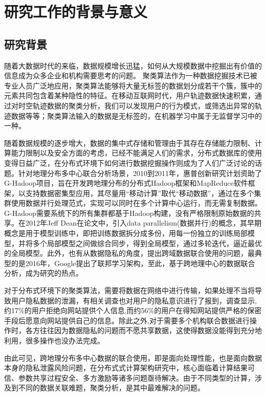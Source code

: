 \thesischapterexordium

\section{研究工作的背景与意义}

\subsection{研究背景}

随着大数据时代的来临，数据规模增长迅猛，如何从大规模数据中挖掘出有价值的信息成为众多企业和机构需要思考的问题。
聚类算法作为一种数据挖掘技术已被专业人员广泛地应用，聚类算法能够将大量无标签的数据划分成若干个簇，簇中的元素共同包含着某种隐性的特征。在移动互联网时代，用户轨迹数据快速积累，通过对时空轨迹数据的聚类分析，我们可以发现用户的行为模式，或筛选出异常的轨迹数据等等；聚类算法输入的数据是无标签的，在机器学习中属于无监督学习中的一种。

随着数据规模的逐步增大，数据的集中式存储和管理由于其存在存储能力限制、计算能力限制以及安全方面的考虑，已经不能满足人们的需求，分布式数据库的使用变得日益广泛，在分布式环境下如何进行数据挖掘操作则成为了人们广泛讨论的话题。针对地理分布多中心联合分析场景，2010到2011年，惠普创新研究计划资助了G-Hadoop项目，旨在开发跨地理分布的分布式Hadoop框架和MapReduce软件框架，以支持数据密集型应用，其尽量用“移动计算”取代“移动数据”，通过在多个集群使用数据并行处理范式，实现可以同时在多个计算中心运行，而无需复制数据。G-Hadoop需要系统下的所有集群都基于Hadoop构建，没有严格限制原始数据的共享。在2012年Jeff Dean在论文\cite{dean2012large}中，引入data parallelism(数据并行)的概念，其早期概念是用于模型训练中，即把训练数据拆分成多份，用每一份独立的训练局部模型，并将多个局部模型之间做综合同步，得到全局模型，通过多轮迭代，逼近最优的全局模型。此外，也有从数据隐私的角度，提出跨域数据联合使用的问题，最典型的是2016年，Google提出了联邦学习架构，至此，基于跨地理中心的数据联合分析，成为研究的热点。

对于分布式环境下的聚类算法，需要将数据在网络中进行传输，如果处理不当将导致用户隐私数据的泄漏，有相关调查也对用户的隐私意识进行了报到，调查显示,约17\%的用户拒绝向网站提供个人信息,而约56\%的用户在得知网站提供严格的保密手段后愿意向网站提供自己的信息。除此之外,对于需要多个机构联合数据进行操作时，各方往往因为数据隐私的问题而不愿共享数据，这使得数据没能得到充分地利用，很多操作也没办法完成。

由此可见，跨地理分布多中心数据的联合使用，即是面向处理性能，也是面向数据本身的隐私泄露风险问题，在分布式式计算架构研究中，核心面临着计算结果可信、参数共享过程安全、多方激励等诸多问题亟待解决。由于不同类型的计算，涉及到不同的数据关联难题，聚类分析，是其中最难解决的问题。

